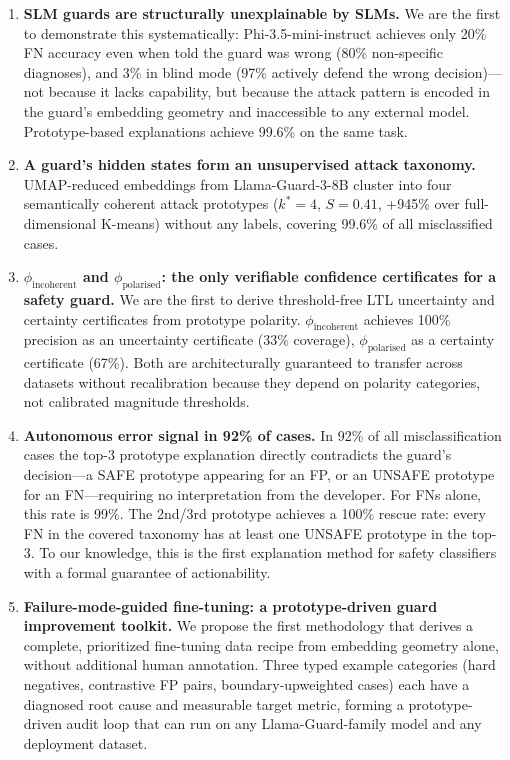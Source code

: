 \documentclass[letterpaper]{article}
\begin{document}
\begin{enumerate}
\item \textbf{SLM guards are structurally unexplainable by SLMs.}
We are the first to demonstrate this systematically: Phi-3.5-mini-instruct achieves
only 20\% FN accuracy even when told the guard was wrong (80\% non-specific diagnoses),
and 3\% in blind mode (97\% actively defend the wrong decision)---not because it lacks
capability, but because the attack pattern is encoded in the guard's embedding geometry
and inaccessible to any external model. Prototype-based explanations achieve 99.6\%
on the same task.

\item \textbf{A guard's hidden states form an unsupervised attack taxonomy.}
UMAP-reduced embeddings from Llama-Guard-3-8B cluster into four semantically coherent
attack prototypes ($k^*{=}4$, $S{=}0.41$, +945\% over full-dimensional K-means)
without any labels, covering 99.6\% of all misclassified cases.

\item \textbf{$\phi_\text{incoherent}$ and $\phi_\text{polarised}$: the only verifiable
confidence certificates for a safety guard.}
We are the first to derive threshold-free LTL uncertainty and certainty certificates from
prototype polarity. $\phi_\text{incoherent}$ achieves 100\% precision as an uncertainty
certificate (33\% coverage), $\phi_\text{polarised}$ as a certainty certificate (67\%).
Both are architecturally guaranteed to transfer across datasets without recalibration
because they depend on polarity categories, not calibrated magnitude thresholds.

\item \textbf{Autonomous error signal in 92\% of cases.}
In 92\% of all misclassification cases the top-3 prototype explanation directly contradicts
the guard's decision---a SAFE prototype appearing for an FP, or an UNSAFE prototype for
an FN---requiring no interpretation from the developer. For FNs alone, this rate is 99\%.
The 2nd/3rd prototype achieves a 100\% rescue rate: every FN in the covered taxonomy has
at least one UNSAFE prototype in the top-3. To our knowledge, this is the first
explanation method for safety classifiers with a formal guarantee of actionability.

\item \textbf{Failure-mode-guided fine-tuning: a prototype-driven guard improvement toolkit.}
We propose the first methodology that derives a complete, prioritized fine-tuning data recipe
from embedding geometry alone, without additional human annotation. Three typed example
categories (hard negatives, contrastive FP pairs, boundary-upweighted cases) each have
a diagnosed root cause and measurable target metric, forming a prototype-driven audit
loop that can run on any Llama-Guard-family model and any deployment dataset.
\end{enumerate}
\end{document}
